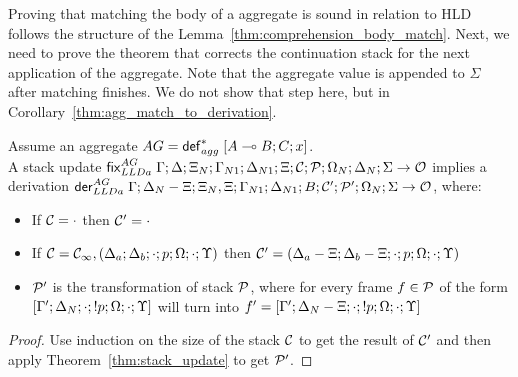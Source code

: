 Proving that matching the body of a aggregate is sound in relation to HLD
follows the structure of the Lemma~\ref{thm:comprehension_body_match}. Next, we
need to prove the theorem that corrects the continuation stack for the next
application of the aggregate. Note that the aggregate value is appended to
$\Sigma$ after matching finishes. We do not show that step here, but in
Corollary~\ref{thm:agg_match_to_derivation}.

\begin{theorem}\label{thm:agg_from_update_to_derivation}
Assume an aggregate $AG = \mathsf{def}_{agg}^{*} \; [A \multimap B ; C; x]$. \\ A stack update
$\mathsf{fix}_{LLDa}^{AG} \; \Gamma; \Delta; \Xi_N; \Gamma_{N1}; \Delta_{N1}; \Xi; \mathcal{C};
\mathcal{P}; \Omega_N; \Delta_N; \Sigma \rightarrow \mathcal{O}$ implies a derivation
$\mathsf{der}_{LLDa}^{AG} \; \Gamma; \Delta_N - \Xi; \Xi_N, \Xi; \Gamma_{N1}; \Delta_{N1}; B;
\mathcal{C'} ; \mathcal{P'}; \Omega_N; \Sigma \rightarrow
\mathcal{O}$, where:

\begin{itemize}[leftmargin=*]
   \item If $\mathcal{C} = \cdot$ then $\mathcal{C'} = \cdot$

   \item If $\mathcal{C} = \mathcal{C_{1}}, (\Delta_a; \Delta_b; \cdot; p; \Omega; \cdot; \Upsilon)$
   then $\mathcal{C'} = (\Delta_a - \Xi; \Delta_b - \Xi; \cdot; p; \Omega; \cdot;
         \Upsilon)$

   \item $\mathcal{P'}$ is the transformation of stack $\mathcal{P}$, where for every frame $f \in
   \mathcal{P}$ of the form $[\Gamma'; \Delta_N; \cdot; {!} p; \Omega; \cdot; \Upsilon]$
   will turn into $f' = [\Gamma';\Delta_N-\Xi;\cdot;{!} p;\Omega;\cdot;\Upsilon]$

\end{itemize}
\end{theorem}
\begin{proof}
Use induction on the size of the stack $\mathcal{C}$ to get the result of
$\mathcal{C'}$ and then apply Theorem~\ref{thm:stack_update} to get $\mathcal{P'}$.
\end{proof}

